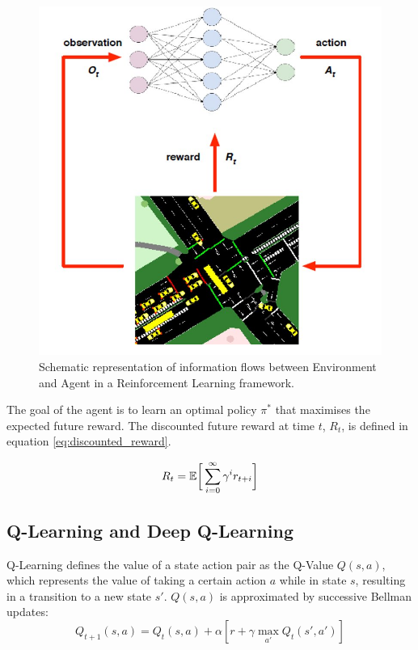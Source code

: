\documentclass[conference]{IEEEtran}
\begin{document}
\begin{figure}[thpb]
    \centering
    \includegraphics[width=\linewidth]{figures/rl.PNG}
    \caption{Schematic representation of information flows between Environment and Agent in a Reinforcement Learning framework.}
    \label{fig:RL}
\end{figure}

The goal of the agent is to learn an optimal policy $\pi^*$ that maximises the expected future reward. The discounted future reward at time $t$, $R_t$, is defined in equation \eqref{eq:discounted_reward}.

\begin{equation}
R_t = \mathbb{E} \bigg{[} \sum^{\infty}_{i=0} \gamma^i r_{t+i} \bigg{]} 
\label{eq:discounted_reward}     
\end{equation}

\subsection{Q-Learning and Deep Q-Learning}
Q-Learning \cite{watkins} defines the value of a state action pair as the Q-Value $Q(s,a)$, which represents the value of taking a certain action $a$ while in state $s$, resulting in a transition to a new state $s'$.
$Q(s,a)$ is approximated by successive Bellman updates:
\begin{equation}
    Q_{t+1}(s,a) = Q_t(s,a) + \alpha [r + \gamma \max_{a'}Q_t(s',a')]
\label{eq:bellman}
\end{equation}
\end{document}
